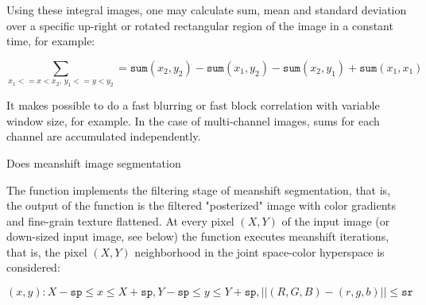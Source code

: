 Using these integral images, one may calculate sum, mean and standard deviation over a specific up-right or rotated rectangular region of the image in a constant time, for example:

\[
\sum_{x_1<=x<x_2, \, y_1<=y<y_2} = \texttt{sum}(x_2,y_2)-\texttt{sum}(x_1,y_2)-\texttt{sum}(x_2,y_1)+\texttt{sum}(x_1,x_1)
\]

It makes possible to do a fast blurring or fast block correlation with variable window size, for example. In the case of multi-channel images, sums for each channel are accumulated independently.


Does meanshift image segmentation


\begin{description}
\end{description}

The function implements the filtering
stage of meanshift segmentation, that is, the output of the function is
the filtered "posterized" image with color gradients and fine-grain
texture flattened. At every pixel $(X,Y)$ of the input image (or
down-sized input image, see below) the function executes meanshift
iterations, that is, the pixel $(X,Y)$ neighborhood in the joint
space-color hyperspace is considered:

\[
(x,y): X-\texttt{sp} \le x \le X+\texttt{sp} , Y-\texttt{sp} \le y \le Y+\texttt{sp} , ||(R,G,B)-(r,g,b)||  \le  \texttt{sr}
\]

